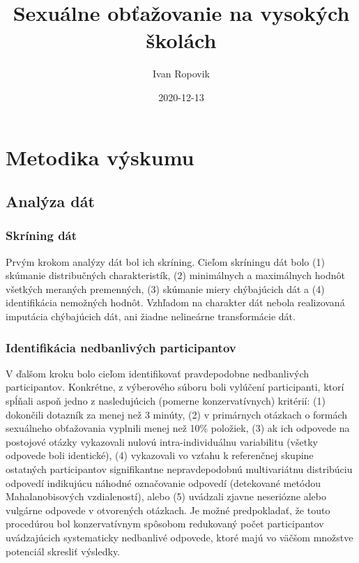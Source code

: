 \documentclass[
]{article}
\title{Sexuálne obťažovanie na vysokých školách}
\author{Ivan Ropovik}
\date{2020-12-13}
\begin{document}
\maketitle

{
\setcounter{tocdepth}{2}
\tableofcontents
}
\newpage

\hypertarget{metodika-vuxfdskumu}{%
\section{Metodika výskumu}\label{metodika-vuxfdskumu}}

\hypertarget{analyza-dat}{%
\subsection{Analýza dát}\label{analyza-dat}}

\hypertarget{skruxedning-duxe1t}{%
\subsubsection{Skríning dát}\label{skruxedning-duxe1t}}

Prvým krokom analýzy dát bol ich skríning. Cieľom skríningu dát bolo (1) skúmanie distribučných charakteristík, (2) minimálnych a maximálnych hodnôt všetkých meraných premenných, (3) skúmanie miery chýbajúcich dát a (4) identifikácia nemožných hodnôt. Vzhľadom na charakter dát nebola realizovaná imputácia chýbajúcich dát, ani žiadne nelineárne transformácie dát.

\hypertarget{identifikuxe1cia-nedbanlivuxfdch-participantov}{%
\subsubsection{Identifikácia nedbanlivých participantov}\label{identifikuxe1cia-nedbanlivuxfdch-participantov}}

V ďalšom kroku bolo cieľom identifikovať pravdepodobne nedbanlivých participantov. Konkrétne, z výberového súboru boli vylúčení participanti, ktorí spĺňali aspoň jedno z nasledujúcich (pomerne konzervatívnych) kritérií: (1) dokončili dotazník za menej než 3 minúty, (2) v primárnych otázkach o formách sexuálneho obťažovania vyplnili menej než 10\% položiek, (3) ak ich odpovede na postojové otázky vykazovali nulovú intra-individuálnu variabilitu (všetky odpovede boli identické), (4) vykazovali vo vzťahu k referenčnej skupine ostatných participantov signifikantne nepravdepodobnú multivariátnu distribúciu odpovedí indikujúcu náhodné označovanie odpovedí (detekované metódou Mahalanobisových vzdialeností), alebo (5) uvádzali zjavne neseriózne alebo vulgárne odpovede v otvorených otázkach. Je možné predpokladať, že touto procedúrou bol konzervatívnym spôsobom redukovaný počet participantov uvádzajúcich systematicky nedbanlivé odpovede, ktoré majú vo väčšom množstve potenciál skresliť výsledky.
\end{document}
